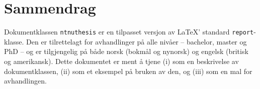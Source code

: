 \chapter*{Sammendrag}

Dokumentklassen \texttt{ntnuthesis} er en tilpasset versjon av \LaTeX' standard \texttt{report}-klasse. Den er tilrettelagt for avhandlinger på alle nivåer – bachelor, master og PhD – og er tilgjengelig på både norsk (bokmål og nynorsk) og engelsk (britisk og amerikansk). Dette dokumentet er ment å tjene (i) som en beskrivelse av dokument\-klassen, (ii) som et eksempel på bruken av den, og (iii) som en mal for avhandlingen.

